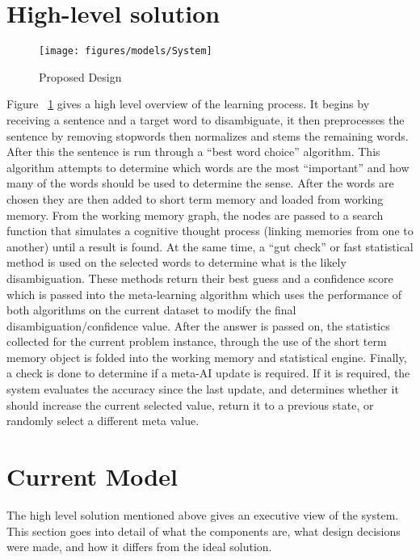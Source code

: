 \section{High-level solution}

\begin{figure}[htp]
	\begin{center}
		\texttt{[image: figures/models/System]}
		\caption{Proposed Design}
	\end{center}
	\label{fig:high_level_solution}
\end{figure}

Figure ~\ref{fig:high_level_solution} gives a high level overview of the learning process.  It begins by receiving a sentence and a target word to disambiguate, it then preprocesses the sentence by removing stopwords then normalizes and stems the remaining words.  After this the sentence is run through a ``best word choice'' algorithm.  This algorithm attempts to determine which words are the most ``important'' and how many of the words should be used to determine the sense. After the words are chosen they are then added to short term memory and loaded from working memory.  From the working memory graph, the nodes are passed to a search function that simulates a cognitive thought process (linking memories from one to another) until a result is found.  At the same time, a ``gut check'' or fast statistical method is used on the selected words to determine what is the likely disambiguation. These methods return their best guess and a confidence score which is passed into the meta-learning algorithm which uses the performance of both algorithms on the current dataset to modify the final disambiguation/confidence value.  After the answer is passed on, the statistics collected for the current problem instance, through the use of the short term memory object is folded into the working memory and statistical engine.  Finally, a check is done to determine if a meta-AI update is required.  If it is required, the system evaluates the accuracy since the last update, and determines whether it should increase the current selected value, return it to a previous state, or randomly select a different meta value.

\section{Current Model}

The high level solution mentioned above gives an executive view of the system.  This section goes into detail of what the components are, what design decisions were made, and how it differs from the ideal solution.

